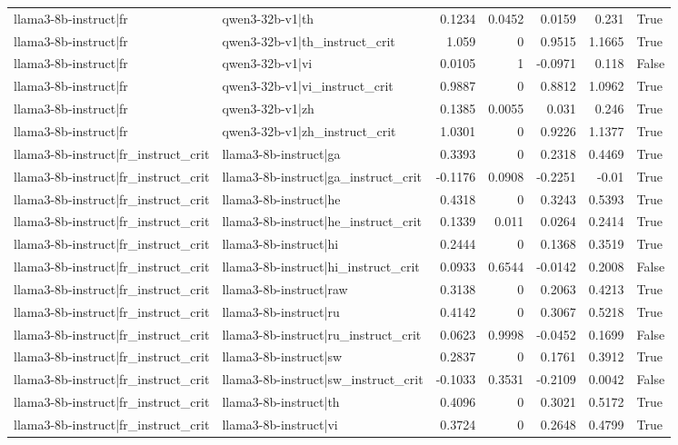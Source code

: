 \begin{table}
\begin{tabular}{l l r r r r l}
llama3-8b-instruct|fr & qwen3-32b-v1|th & 0.1234 & 0.0452 & 0.0159 & 0.231 & True \\
llama3-8b-instruct|fr & qwen3-32b-v1|th_instruct_crit & 1.059 & 0 & 0.9515 & 1.1665 & True \\
llama3-8b-instruct|fr & qwen3-32b-v1|vi & 0.0105 & 1 & -0.0971 & 0.118 & False \\
llama3-8b-instruct|fr & qwen3-32b-v1|vi_instruct_crit & 0.9887 & 0 & 0.8812 & 1.0962 & True \\
llama3-8b-instruct|fr & qwen3-32b-v1|zh & 0.1385 & 0.0055 & 0.031 & 0.246 & True \\
llama3-8b-instruct|fr & qwen3-32b-v1|zh_instruct_crit & 1.0301 & 0 & 0.9226 & 1.1377 & True \\
llama3-8b-instruct|fr_instruct_crit & llama3-8b-instruct|ga & 0.3393 & 0 & 0.2318 & 0.4469 & True \\
llama3-8b-instruct|fr_instruct_crit & llama3-8b-instruct|ga_instruct_crit & -0.1176 & 0.0908 & -0.2251 & -0.01 & True \\
llama3-8b-instruct|fr_instruct_crit & llama3-8b-instruct|he & 0.4318 & 0 & 0.3243 & 0.5393 & True \\
llama3-8b-instruct|fr_instruct_crit & llama3-8b-instruct|he_instruct_crit & 0.1339 & 0.011 & 0.0264 & 0.2414 & True \\
llama3-8b-instruct|fr_instruct_crit & llama3-8b-instruct|hi & 0.2444 & 0 & 0.1368 & 0.3519 & True \\
llama3-8b-instruct|fr_instruct_crit & llama3-8b-instruct|hi_instruct_crit & 0.0933 & 0.6544 & -0.0142 & 0.2008 & False \\
llama3-8b-instruct|fr_instruct_crit & llama3-8b-instruct|raw & 0.3138 & 0 & 0.2063 & 0.4213 & True \\
llama3-8b-instruct|fr_instruct_crit & llama3-8b-instruct|ru & 0.4142 & 0 & 0.3067 & 0.5218 & True \\
llama3-8b-instruct|fr_instruct_crit & llama3-8b-instruct|ru_instruct_crit & 0.0623 & 0.9998 & -0.0452 & 0.1699 & False \\
llama3-8b-instruct|fr_instruct_crit & llama3-8b-instruct|sw & 0.2837 & 0 & 0.1761 & 0.3912 & True \\
llama3-8b-instruct|fr_instruct_crit & llama3-8b-instruct|sw_instruct_crit & -0.1033 & 0.3531 & -0.2109 & 0.0042 & False \\
llama3-8b-instruct|fr_instruct_crit & llama3-8b-instruct|th & 0.4096 & 0 & 0.3021 & 0.5172 & True \\
llama3-8b-instruct|fr_instruct_crit & llama3-8b-instruct|vi & 0.3724 & 0 & 0.2648 & 0.4799 & True \\

\end{tabular}
\end{table}
